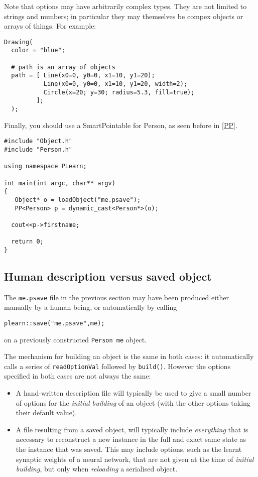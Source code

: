 \documentclass[11pt]{book}
\begin{document}
Note that options may have arbitrarily complex types. They are not limited to strings and numbers; in particular they may
themselves be compex objects or arrays of things. For example:

\begin{verbatim}
Drawing(
  color = "blue";

  # path is an array of objects
  path = [ Line(x0=0, y0=0, x1=10, y1=20); 
           Line(x0=0, y0=0, x1=10, y1=20, width=2);
           Circle(x=20; y=30; radius=5.3, fill=true);
         ];
  );
\end{verbatim}

Finally, you should use a SmartPointable for Person, as seen before in \ref{PP}.

\begin{verbatim}
#include "Object.h"
#include "Person.h"

using namespace PLearn;

int main(int argc, char** argv)
{
   Object* o = loadObject("me.psave"); 
   PP<Person> p = dynamic_cast<Person*>(o);

  cout<<p->firstname;

  return 0;
}
\end{verbatim}


\subsection{Human description versus saved object} 

The {\tt me.psave} file in the previous section may have been produced
either manually by a human being, or automatically by calling 
\begin{verbatim}
plearn::save("me.psave",me);
\end{verbatim}
on a previously constructed {\tt Person me} object.

The mechanism for building an object is the same in both cases: it automatically calls a series of {\tt readOptionVal} followed by {\tt build()}. However the options specified in both cases are not always the same:

\begin{itemize}
\item A hand-written description file will typically be used to give a small number of options for the {\em initial building} of an object (with the other options taking their default value).
\item A file resulting from a saved object, will typically include {\em everything} that is necessary to reconstruct a new instance in the full and exact same state as the instance that was saved. This may include options, such as the learnt synaptic weights of a neural network, that are not given at the time of {\em initial building}, but only when {\em reloading} a serialised object.
\end{itemize}
\end{document}
